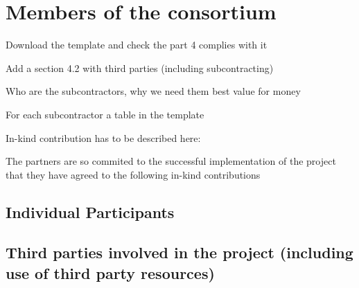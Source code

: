 \chapter{Members of the consortium}

{\color{red} Download the template and check the part 4 complies with it}

{\color{red} Add a section 4.2 with third parties (including subcontracting)

Who are the subcontractors, why we need them best value for money

For each subcontractor a table in the template

In-kind contribution has to be described here:

The partners are so commited to the successful implementation of the
project that they have agreed to the following in-kind contributions}

\section{Individual Participants}
\label{sec:partners}






























\section{Third parties involved in the project (including use of third party resources)}


